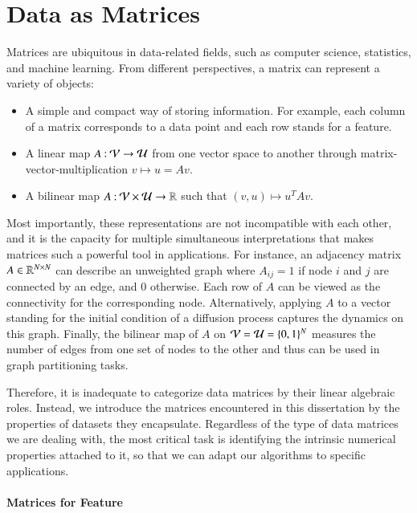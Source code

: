 \section{Data as Matrices}\label{pre:dam}

Matrices are ubiquitous in data\hyp{}related fields, such as computer science,
statistics, and machine learning. From different perspectives, a matrix can
represent a variety of objects:
\begin{itemize}
	\item A simple and compact way of storing information. For example, each
	column of a matrix corresponds to a data point and each row stands for a
	feature.
	\item A linear map $A\mathbin{:}\mathcal{V}\to\mathcal{U}$ from one vector space to another
	through matrix\hyp{}vector\hyp{}multiplication $v\mapsto u = Av$. 
	\item A bilinear map $A\mathbin{:}\mathcal{V}\times\mathcal{U}\to \mathbb{R}$ such that $(v,
	u)\mapsto u^TAv$.
\end{itemize}
Most importantly, these representations are not incompatible with each other,
and it is the capacity for multiple simultaneous interpretations that makes
matrices such a powerful tool in applications. For instance, an adjacency matrix
$A\in\mathbb{R}^{N\mathbin{\times} N}$ can describe an unweighted graph where $A_{ij} = 1$ if
node $i$ and $j$ are connected by an edge, and $0$ otherwise. Each row of $A$
can be viewed as the connectivity for the corresponding node. Alternatively,
applying $A$ to a vector standing for the initial condition of a diffusion
process captures the dynamics on this graph. Finally, the bilinear map of $A$ on
$\mathcal{V} = \mathcal{U} = \{0, 1\}^N$ measures the number of edges from one set of nodes
to the other and thus can be used in graph partitioning tasks.

Therefore, it is inadequate to categorize data matrices by their linear
algebraic roles. Instead, we introduce the matrices encountered in this
dissertation by the properties of datasets they encapsulate. Regardless of the
type of data matrices we are dealing with, the most critical task is identifying
the intrinsic numerical properties attached to it, so that we can adapt our
algorithms to specific applications.

\paragraph{Matrices for Feature}

